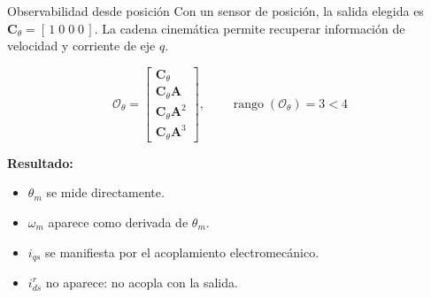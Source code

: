 \documentclass[aspectratio=169,t]{beamer}
\begin{document}
\begin{frame}{Observabilidad desde posición}
{\small\color{uncGray}Con un sensor de posición, la salida elegida es $\bm{C}_\theta=[\,1\;0\;0\;0\,]$. La cadena cinemática permite recuperar información de velocidad y corriente de eje $q$.}\par
\vspace{3mm}

\begin{equation*}
\mathcal{O}_\theta=
\begin{bmatrix}
\bm{C}_\theta\\
\bm{C}_\theta\bm{A}\\
\bm{C}_\theta\bm{A}^2\\
\bm{C}_\theta\bm{A}^3
\end{bmatrix},
\qquad
\operatorname{rango}(\mathcal{O}_\theta)=3<4
\end{equation*}

\textbf{Resultado:}
\begin{itemize}
  \item $\theta_m$ se mide directamente.
  \item $\omega_m$ aparece como derivada de $\theta_m$.
  \item $i_{qs}$ se manifiesta por el acoplamiento electromecánico.
  \item $i_{ds}^{r}$ no aparece: no acopla con la salida.
\end{itemize}
\end{frame}
\end{document}
